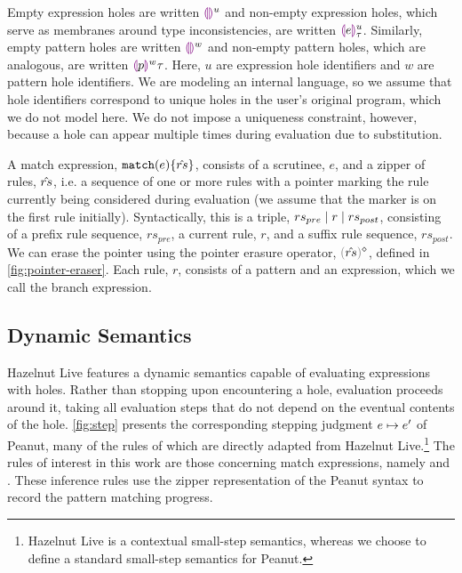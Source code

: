 Empty expression holes are written $\textcolor{violet}{\llparenthesis}\textcolor{violet}{\rrparenthesis}^{u}$ and non-empty expression holes, which serve as membranes around type inconsistencies, are written $\textcolor{violet}{\llparenthesis} e\textcolor{violet}{\rrparenthesis}^{u}_{\tau}$. Similarly, empty pattern holes are written $\textcolor{violet}{\llparenthesis}\textcolor{violet}{\rrparenthesis}^{w}$ and non-empty pattern holes, which are analogous, are written $\textcolor{violet}{\llparenthesis} p\textcolor{violet}{\rrparenthesis}^{w}{\tau}$. Here, $u$ are expression hole identifiers and $w$ are pattern hole identifiers.
We are modeling an internal language, so we assume that hole identifiers 
correspond to unique holes in the user's original program, which we do not model here. We do not impose a uniqueness constraint, however, because a hole can 
appear multiple times during evaluation due to substitution.

A match expression, $\mathtt{match}(e) \{\hat{rs}\}$, 
consists of a scrutinee, $e$, and a zipper of rules, $\hat{rs}$, i.e. a sequence of one or more rules with a pointer marking the rule currently being considered during evaluation (we assume that the marker is on the first rule initially). Syntactically, this is a triple, $rs_{pre} \mid r \mid rs_{post}$, consisting of a prefix rule sequence, $rs_{pre}$, a current rule, $r$, and a suffix rule sequence, $rs_{post}$. We can erase the pointer using the pointer erasure operator, $\rmpointer{\zrules}$, defined in \autoref{fig:pointer-eraser}. 
Each rule, $r$, consists of a pattern and an expression, which we call the branch expression.



\subsection{Dynamic Semantics}\label{sec:dynamics}




Hazelnut Live \cite{DBLP:journals/pacmpl/OmarVCH19} features a dynamic semantics capable of evaluating expressions with holes.
Rather than stopping upon encountering a hole, evaluation proceeds around it, taking all evaluation steps that do not depend on the eventual contents of the hole.
\autoref{fig:step} presents the corresponding stepping judgment $e \mapsto e'$ of Peanut, many of the rules of which are directly adapted from Hazelnut Live.\footnote{Hazelnut Live is a contextual small-step semantics, whereas we choose to define a standard small-step semantics for Peanut.}
The rules of interest in this work are those concerning match expressions, namely \ITSuccMatch and \ITFailMatch.
These inference rules use the zipper representation of the Peanut syntax to record the pattern matching progress.

